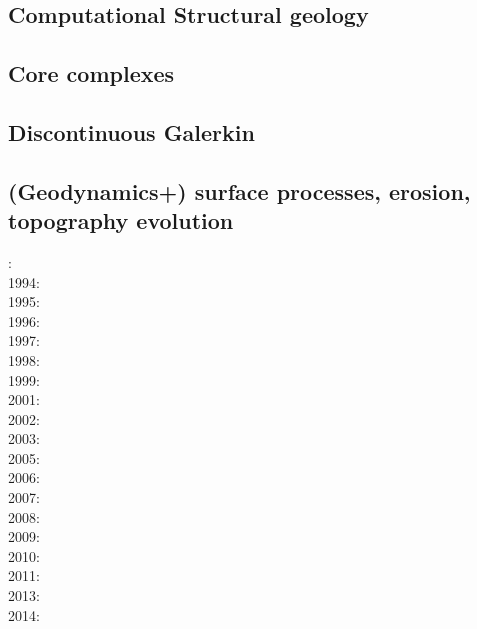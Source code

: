 \subsection*{Computational Structural geology}

\cite{acgf00}
\cite{trla00}
\cite{masc01}
\cite{manc08}

\subsection*{Core complexes}

\cite{lehm12}

\subsection*{Discontinuous Galerkin}

\cite{kauf12}\cite{ngpc10}\cite{coks09}\cite{fewk17}\cite{kans08}\cite{geor11}
\cite{cogo09}\cite{cacp02}\cite{cacs05}\cite{coks05}\cite{coks02}\cite{coks00}
\cite{mofh08}\cite{iglo17}\cite{ngpe12}\cite{puth18}\cite{hepb17}\cite{ngpc11}
\cite{conp10}\cite{mofp10}\cite{lelk15} 

\subsection*{(Geodynamics+) surface processes, erosion, topography evolution}

: \cite{befh92}\\
1994: \cite{howa94}\cite{koon94}\cite{kobe94}\\
1995: \cite{chmm95}\cite{koon95}\\
1996: \cite{avbu96}\\
1997: \cite{brsa97}\\
1998: \cite{deea98}\\
1999: \cite{will99a}\cite{bupi99}\cite{babr99}\\
2001: \cite{zemk01}\cite{tulg01}\cite{brsh01}\cite{bupo01}\cite{coul01}\cite{crda01}\\
2002: \cite{wibr02}\\
2003: \cite{brau03}\\
2005: \cite{lave05}\cite{will05}\\
2006: \cite{rosw06}\cite{brau06gsl}\\
2007: \cite{buto07}\\
2008: \cite{alle08}\cite{rowf08}\\
2009: \cite{whip09}\cite{kuhe09}\\
2010: \cite{will10}\cite{tuha10}\cite{brau10b}\cite{brau10}\cite{brya10}\cite{cmwt10}\\
2011: \cite{robr11}\\
2013: \cite{vehc13}\cite{brwi13}\\
2014: \cite{crbr14}\cite{cokm14}

